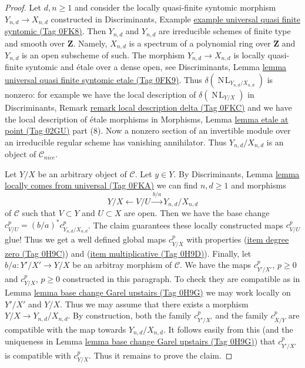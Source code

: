 \documentclass{amsart}
\theoremstyle{plain}
\theoremstyle{definition}
\theoremstyle{remark}
\numberwithin{equation}{subsection}
\def\NL{\mathop{N\!L}\nolimits}
\begin{document}
\begin{proof}
\medskip\noindent
Let $d, n \geq 1$ and consider the locally
quasi-finite syntomic morphism $Y_{n, d} \to X_{n, d}$
constructed in Discriminants, Example
\href{https://stacks.math.columbia.edu/tag/0FK8}{example universal quasi finite syntomic (Tag 0FK8)}.
Then $Y_{n, d}$ and $Y_{n, d}$ are irreducible schemes of finite type and
smooth over $\mathbf{Z}$. Namely, $X_{n, d}$ is a spectrum of a
polynomial ring over $\mathbf{Z}$ and $Y_{n, d}$ is an open subscheme
of such. The morphism $Y_{n, d} \to X_{n, d}$ is locally quasi-finite syntomic
and \'etale over a dense open, see Discriminants, Lemma
\href{https://stacks.math.columbia.edu/tag/0FK9}{lemma universal quasi finite syntomic etale (Tag 0FK9)}.
Thus $\delta(\NL_{Y_{n, d}/X_{n, d}})$ is nonzero: for example we have
the local description of $\delta(\NL_{Y/X})$ in
Discriminants, Remark \href{https://stacks.math.columbia.edu/tag/0FKC}{remark local description delta (Tag 0FKC)}
and we have the local description of \'etale morphisms in
Morphisms, Lemma \href{https://stacks.math.columbia.edu/tag/02GU}{lemma etale at point (Tag 02GU)} part (8).
Now a nonzero section of an invertible module over an irreducible
regular scheme has vanishing annihilator. Thus
$Y_{n, d}/X_{n, d}$ is an object of $\mathcal{C}_{nice}$.

\medskip\noindent
Let $Y/X$ be an arbitrary object of $\mathcal{C}$. Let $y \in Y$.
By Discriminants, Lemma \href{https://stacks.math.columbia.edu/tag/0FKA}{lemma locally comes from universal (Tag 0FKA)}
we can find $n, d \geq 1$ and morphisms
$$
Y/X \leftarrow V/U \xrightarrow{b/a} Y_{n, d}/X_{n, d}
$$
of $\mathcal{C}$ such that $V \subset Y$ and $U \subset X$ are open.
Then we have the base change $c^p_{V/U} = (b/a)^*c^p_{Y_{n, d}/X_{n, d}}$.
The claim guarantees these locally constructed maps $c^p_{V/U}$ glue!
Thus we get a well defined global maps $c^p_{Y/X}$ with properties
(\href{https://stacks.math.columbia.edu/tag/0H9C}{item degree zero (Tag 0H9C)}) and (\href{https://stacks.math.columbia.edu/tag/0H9D}{item multiplicative (Tag 0H9D)}).
Finally, let $b/a : Y'/X' \to Y/X$ be an arbitray morphism of $\mathcal{C}$.
We have the maps $c^p_{Y'/X'}$, $p \geq 0$ and $c^p_{Y/X}$, $p \geq 0$
constructed in this paragraph. To check they are compatible as in
Lemma \href{https://stacks.math.columbia.edu/tag/0H9G}{lemma base change Garel upstairs (Tag 0H9G)} we may work locally
on $Y'/X'$ and $Y/X$. Thus we may assume that there exists a morphism
$Y/X \to Y_{n, d}/X_{n, d}$. By construction, both the family
$c^p_{Y'/X'}$ and the family $c^p_{X/Y}$ are compatible with
the map towards $Y_{n, d}/X_{n, d}$. It follows easily from this
(and the uniqueness in Lemma \href{https://stacks.math.columbia.edu/tag/0H9G}{lemma base change Garel upstairs (Tag 0H9G)})
that $c^p_{Y'/X'}$ is compatible with $c^p_{Y/X}$.
Thus it remains to prove the claim.


\end{proof}
\end{document}
